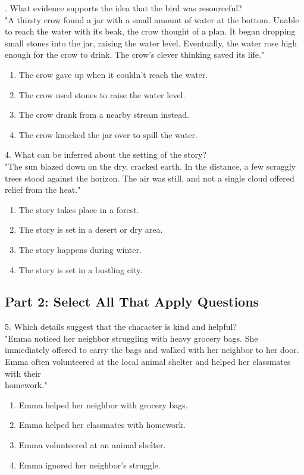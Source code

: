 \documentclass[12pt]{article}
\begin{document}
\vspace{1cm}
. What evidence supports the idea that the bird was resourceful?\\
"A thirsty crow found a jar with a small amount of water at the bottom. Unable to reach the water with its beak, the crow thought of a plan. It began dropping small stones into the jar, raising the water level. Eventually, the water rose high enough for the crow to drink. The crow’s clever thinking saved its life."\\
\begin{enumerate}[label=\Alph*.]
    \item The crow gave up when it couldn’t reach the water.  
    \item The crow used stones to raise the water level.  
    \item The crow drank from a nearby stream instead.  
    \item The crow knocked the jar over to spill the water.  
\end{enumerate}

\vspace{1cm}

4. What can be inferred about the setting of the story?\\
"The sun blazed down on the dry, cracked earth. In the distance, a few scraggly trees stood against the horizon. The air was still, and not a single cloud offered relief from the heat."\\
\begin{enumerate}[label=\Alph*.]
    \item The story takes place in a forest.  
    \item The story is set in a desert or dry area.  
    \item The story happens during winter.  
    \item The story is set in a bustling city.  
\end{enumerate}


\subsection*{Part 2: Select All That Apply Questions}

5. Which details suggest that the character is kind and helpful?\\
"Emma noticed her neighbor struggling with heavy grocery bags. She immediately offered to carry the bags and walked with her neighbor to her door. Emma often volunteered at the local animal shelter and helped her classmates with their \\homework."\\
\begin{enumerate}[label=\Alph*.]
    \item Emma helped her neighbor with grocery bags.  
    \item Emma helped her classmates with homework.  
    \item Emma volunteered at an animal shelter.  
    \item Emma ignored her neighbor’s struggle.  
\end{enumerate}
\end{document}
